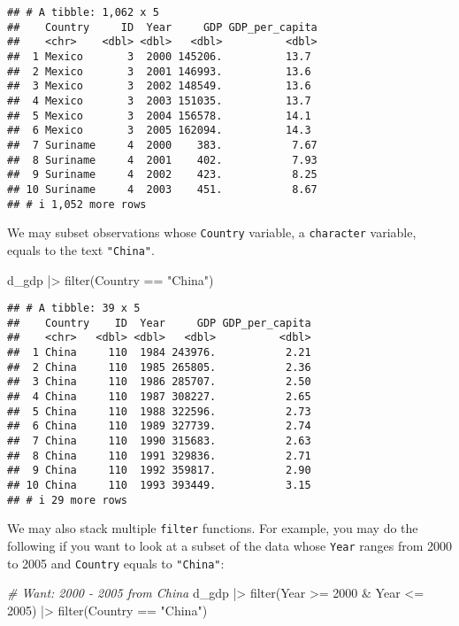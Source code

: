 \documentclass[
]{article}
\newenvironment{Shaded}{\begin{snugshade}}{\end{snugshade}}
\newcommand{\CommentTok}[1]{\textcolor[rgb]{0.56,0.35,0.01}{\textit{#1}}}
\newcommand{\DecValTok}[1]{\textcolor[rgb]{0.00,0.00,0.81}{#1}}
\newcommand{\FunctionTok}[1]{\textcolor[rgb]{0.00,0.00,0.00}{#1}}
\newcommand{\NormalTok}[1]{#1}
\newcommand{\SpecialCharTok}[1]{\textcolor[rgb]{0.00,0.00,0.00}{#1}}
\newcommand{\StringTok}[1]{\textcolor[rgb]{0.31,0.60,0.02}{#1}}
\begin{document}
\begin{verbatim}
## # A tibble: 1,062 x 5
##    Country     ID  Year     GDP GDP_per_capita
##    <chr>    <dbl> <dbl>   <dbl>          <dbl>
##  1 Mexico       3  2000 145206.          13.7 
##  2 Mexico       3  2001 146993.          13.6 
##  3 Mexico       3  2002 148549.          13.6 
##  4 Mexico       3  2003 151035.          13.7 
##  5 Mexico       3  2004 156578.          14.1 
##  6 Mexico       3  2005 162094.          14.3 
##  7 Suriname     4  2000    383.           7.67
##  8 Suriname     4  2001    402.           7.93
##  9 Suriname     4  2002    423.           8.25
## 10 Suriname     4  2003    451.           8.67
## # i 1,052 more rows
\end{verbatim}

We may subset observations whose \texttt{Country} variable, a
\texttt{character} variable, equals to the text \texttt{"China"}.

\begin{Shaded}
\begin{Highlighting}[]
\NormalTok{d\_gdp }\SpecialCharTok{|\textgreater{}} \FunctionTok{filter}\NormalTok{(Country }\SpecialCharTok{==} \StringTok{"China"}\NormalTok{)}
\end{Highlighting}
\end{Shaded}

\begin{verbatim}
## # A tibble: 39 x 5
##    Country    ID  Year     GDP GDP_per_capita
##    <chr>   <dbl> <dbl>   <dbl>          <dbl>
##  1 China     110  1984 243976.           2.21
##  2 China     110  1985 265805.           2.36
##  3 China     110  1986 285707.           2.50
##  4 China     110  1987 308227.           2.65
##  5 China     110  1988 322596.           2.73
##  6 China     110  1989 327739.           2.74
##  7 China     110  1990 315683.           2.63
##  8 China     110  1991 329836.           2.71
##  9 China     110  1992 359817.           2.90
## 10 China     110  1993 393449.           3.15
## # i 29 more rows
\end{verbatim}

We may also stack multiple \texttt{filter} functions. For example, you
may do the following if you want to look at a subset of the data whose
\texttt{Year} ranges from 2000 to 2005 and \texttt{Country} equals to
\texttt{"China"}:

\begin{Shaded}
\begin{Highlighting}[]
\CommentTok{\# Want: 2000 {-} 2005 from China}
\NormalTok{d\_gdp }\SpecialCharTok{|\textgreater{}} 
  \FunctionTok{filter}\NormalTok{(Year }\SpecialCharTok{\textgreater{}=} \DecValTok{2000} \SpecialCharTok{\&}\NormalTok{ Year }\SpecialCharTok{\textless{}=} \DecValTok{2005}\NormalTok{) }\SpecialCharTok{|\textgreater{}} 
  \FunctionTok{filter}\NormalTok{(Country }\SpecialCharTok{==} \StringTok{"China"}\NormalTok{)}
\end{Highlighting}
\end{Shaded}
\end{document}
